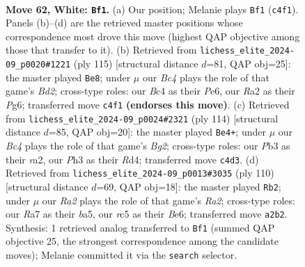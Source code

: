 \documentclass[11pt]{article}
\begin{document}
\clearpage

\begin{figure}[p]\centering
\begin{subfigure}{0.46\textwidth}\centering
\resizebox{\linewidth}{!}{%
\newchessgame
\chessboard[
  setfen={4k2r/R6p/P2n4/2r5/2B5/1Pp3KP/R1P3P1/8 w - - 1 62},
  showmover=false,
  pgfstyle=straightmove, color=movearrow, markmove={c4-f1}
]}
\caption{}
\end{subfigure}\hfill
\begin{subfigure}{0.46\textwidth}\centering
\resizebox{\linewidth}{!}{%
\newchessgame
\chessboard[
  setfen={6k1/r2b1p1p/3Rp1pP/4P1P1/p7/B5P1/3K4/8 b - - 2 58},
  showmover=false,
  pgfstyle=straightmove, color=movearrow, markmove={d7-e8}
]}
\caption{}
\end{subfigure}
\\[4pt]
\begin{subfigure}{0.46\textwidth}\centering
\resizebox{\linewidth}{!}{%
\newchessgame
\chessboard[
  setfen={8/5n2/3p2k1/1P1P2p1/2PR3P/8/r4rB1/2R4K w - - 1 58},
  showmover=false,
  pgfstyle=straightmove, color=movearrow, markmove={g2-e4}
]}
\caption{}
\end{subfigure}\hfill
\begin{subfigure}{0.46\textwidth}\centering
\resizebox{\linewidth}{!}{%
\newchessgame
\chessboard[
  setfen={2r5/7p/pp1kB2r/b2P4/P4R2/4PK2/R4P2/8 w - - 2 56},
  showmover=false,
  pgfstyle=straightmove, color=movearrow, markmove={a2-b2}
]}
\caption{}
\end{subfigure}
\caption{\textbf{Move 62, White: \texttt{Bf1}.} (a) Our position; Melanie plays \texttt{Bf1} (\texttt{c4f1}). Panels (b)--(d) are the retrieved master positions whose correspondence most drove this move (highest QAP objective among those that transfer to it). (b) Retrieved from \texttt{lichess\_elite\_2024-09\_p0020\#1221} (ply 115) [structural distance $d$=81, QAP obj=25]: the master played \texttt{Be8}; under $\mu$ our \emph{Bc4} plays the role of that game's \emph{Bd2}; cross-type roles: our \emph{B}c4 as their \emph{P}e6, our \emph{R}a2 as their \emph{P}g6; transferred move \texttt{c4f1} \textbf{(endorses this move)}. (c) Retrieved from \texttt{lichess\_elite\_2024-09\_p0024\#2321} (ply 114) [structural distance $d$=85, QAP obj=20]: the master played \texttt{Be4+}; under $\mu$ our \emph{Bc4} plays the role of that game's \emph{Bg2}; cross-type roles: our \emph{P}b3 as their \emph{r}a2, our \emph{P}h3 as their \emph{R}d4; transferred move \texttt{c4d3}. (d) Retrieved from \texttt{lichess\_elite\_2024-09\_p0013\#3035} (ply 110) [structural distance $d$=69, QAP obj=18]: the master played \texttt{Rb2}; under $\mu$ our \emph{Ra2} plays the role of that game's \emph{Ra2}; cross-type roles: our \emph{R}a7 as their \emph{b}a5, our \emph{r}c5 as their \emph{B}e6; transferred move \texttt{a2b2}. Synthesis: 1 retrieved analog transferred to \texttt{Bf1} (summed QAP objective 25, the strongest correspondence among the candidate moves); Melanie committed it via the \texttt{search} selector.}
\label{fig:thought-m122}
\end{figure}
\end{document}
